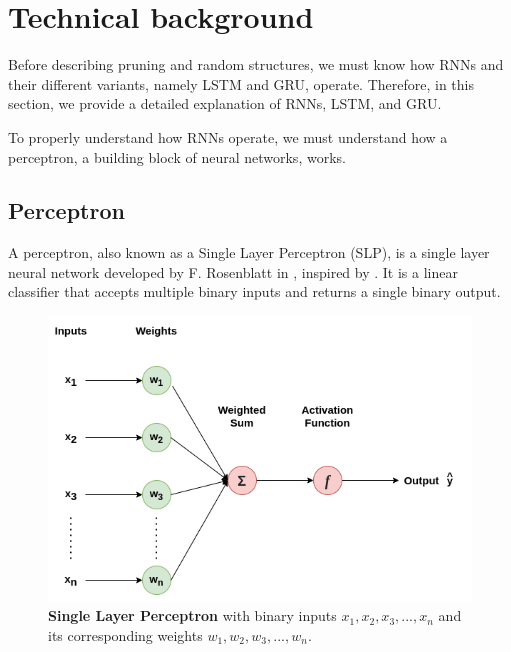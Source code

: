\chapter{Technical background}\label{chap:background}

Before describing pruning and random structures, we must know how RNNs and their different variants, namely LSTM and GRU, operate. Therefore, in this section, we provide a detailed explanation of RNNs, LSTM, and GRU.

To properly understand how RNNs operate, we must understand how a perceptron, a building block of neural networks, works.


\section{Perceptron}\label{section:perceptron}

A perceptron, also known as a Single Layer Perceptron (SLP), is a single layer neural network developed by F. Rosenblatt in \cite{Rosenblatt}, inspired by \cite{mcculloch}. It is a linear classifier that accepts multiple binary inputs and returns a single binary output.

\begin{figure}[h]
	\centering
	\includegraphics[width=0.7\linewidth]{images/background/perceptron.png}
	\caption[Single Layer Perceptron]%
	{\textbf{Single Layer Perceptron} with binary inputs $x_1, x_2, x_3, ..., x_n$ and its corresponding weights $w_1, w_2, w_3, ..., w_n$.}
	\label{fig:perceptron}
\end{figure}

